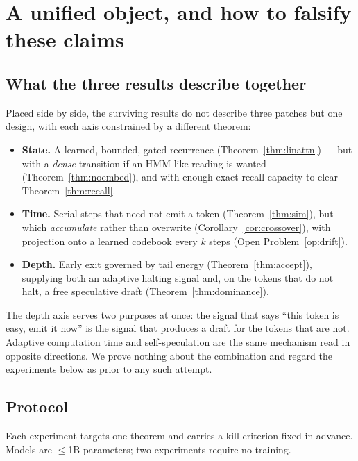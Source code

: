\section{A unified object, and how to falsify these claims}
\label{sec:unified}

\subsection{What the three results describe together}

Placed side by side, the surviving results do not describe three patches but one
design, with each axis constrained by a different theorem:
\begin{itemize}
  \item \textbf{State.} A learned, bounded, gated recurrence
        (Theorem~\ref{thm:linattn}) --- but with a \emph{dense} transition if an
        HMM-like reading is wanted (Theorem~\ref{thm:noembed}), and with enough
        exact-recall capacity to clear Theorem~\ref{thm:recall}.
  \item \textbf{Time.} Serial steps that need not emit a token
        (Theorem~\ref{thm:sim}), but which \emph{accumulate} rather than
        overwrite (Corollary~\ref{cor:crossover}), with projection onto a learned
        codebook every $k$ steps (Open Problem~\ref{op:drift}).
  \item \textbf{Depth.} Early exit governed by tail energy
        (Theorem~\ref{thm:accept}), supplying both an adaptive halting signal and,
        on the tokens that do not halt, a free speculative draft
        (Theorem~\ref{thm:dominance}).
\end{itemize}
The depth axis serves two purposes at once: the signal that says ``this token is
easy, emit it now'' is the signal that produces a draft for the tokens that are
not. Adaptive computation time \cite{graves2016act} and self-speculation are the
same mechanism read in opposite directions. We prove nothing about the
combination and regard the experiments below as prior to any such attempt.

\subsection{Protocol}

Each experiment targets one theorem and carries a kill criterion fixed in
advance. Models are $\le$1B parameters; two experiments require no training.

